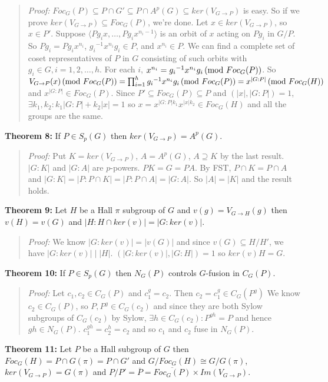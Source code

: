 \begin{quote}
\emph{Proof:}  
$Foc_G(P) \subseteq  P \cap G' \subseteq  P \cap A^p(G)  \subseteq ker(V_{G \rightarrow P})$ is
easy.  So if we prove
$ker(V_{G \rightarrow P}) \subseteq Foc_G(P)$, we're done.  Let $x \in ker(V_{G \rightarrow P})$, so $x \in P'$.
Suppose $\langle Pg_i x, \ldots , P g_i x^{n_i - 1} \rangle$ is an orbit of $x$ acting on $Pg_i$ in $G/P$. So $Pg_i = Pg_i x^{n_i}$,
${g_i}^{-1} x^{n_i} g_i \in P$, and $x^{n_i} \in P$.  
We can find a complete set of coset representatives of $P$ in $G$ consisting of such orbits with $g_i \in G, i = 1,2, \ldots, h$.
For each $i$, $x^{n_i} = {g_i}^{-1} x^{n_i} g_i \thinspace \textnormal{(mod } Foc_G(P) \textnormal{)}$.  So 
$V_{G \rightarrow P}(x) \thinspace \textnormal{(mod } Foc_G(P) \textnormal{)} = \prod_{i=1}^h {g_i}^{-1} x^{n_i} g_i \thinspace \textnormal{(mod } Foc_G(P) \textnormal{)} = x^{|G:P|} \thinspace \textnormal{(mod } Foc_G(H) \textnormal{)}$
and  $x^{|G:P|} \in Foc_G(P)$.  Since $P' \subseteq Foc_G(P) \subseteq P$ and $(|x|, |G:P|) =1$, $\exists k_1, k_2: k_1|G:P| + k_2|x| = 1$
so $x = x^{|G:P| k_1} x^{|x| k_2} \in Foc_G(H)$ and all the groups are the same.
\end{quote}
{\bf Theorem 8:}  
If $P \in S_p(G)$ then $ker(V_{G \rightarrow P})= A^p(G)$.
\begin{quote}
\emph{Proof:}  
Put $K= ker(V_{G \rightarrow P})$, $A= A^p(G)$,  $A \supseteq K$ by the last result.
$|G:K|$ and $|G:A|$ are $p$-powers.  $PK=G=PA$.  By FST, $P \cap K = P \cap A$ and
$|G:K|= |P:P \cap K|= |P: P \cap A|= |G:A|$.  So $|A|= |K|$ and the result holds.
\end{quote}
{\bf Theorem 9:}  
Let $H$ be a Hall $\pi$ subgroup of $G$ and $v(g)= V_{G \rightarrow H}(g)$ then
$v(H)=v(G)$ and $|H: H \cap ker(v)|= |G:ker(v)|$.
\begin{quote}
\emph{Proof:}  
We know $|G:ker(v)| = |v(G)|$ and since
$v(G) \subseteq H/H'$, we have $|G:ker(v)| \mid |H|$.  $(|G:ker(v)|, |G:H|)=1$ so
$ker(v)H=G$.
\end{quote}
{\bf Theorem 10:}  
If $P \in S_p(G)$ then $N_G(P)$ controls $G$-fusion in $C_G(P)$.
\begin{quote}
\emph{Proof:}  
Let $c_1 , c_2 \in C_G(P)$ and $c_1^g=c_2$.  Then $c_2 = c_1^g \in C_G(P^g)$
We know $c_2 \in C_G(P)$, so $P, P^g \in C_G(c_2)$ and since they are both
Sylow subgroups of $C_G(c_2)$ by Sylow, $\exists h \in C_G(c_2): P^{gh}=P$ and
hence $gh \in N_G(P)$.  $c_1^{gh}= c_2^h= c_2$ and so $c_1$ and $c_2$ fuse in $N_G(P)$.
\end{quote}
{\bf Theorem 11:}  Let  $P$ be a Hall subgroup of $G$ then $Foc_G(H) = P \cap G(\pi)=P \cap G'$ and
$G/Foc_G(H) \cong G/G(\pi)$, $ker(V_{G \rightarrow P}) = G(\pi)$ and $P/P' = {\overline P} = {\overline {Foc_G(P)}} \times Im(V_{G \rightarrow P})$.
